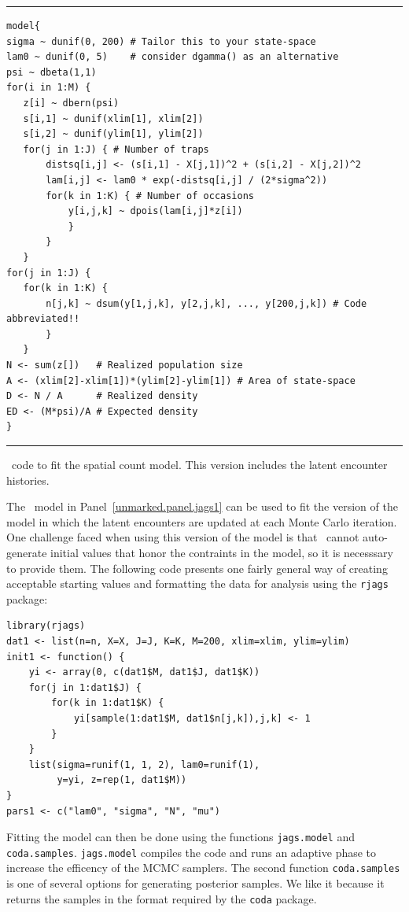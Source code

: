\begin{panel}
\centering
\rule[0.05in]{\textwidth}{.03in}
\begin{small}
\begin{verbatim}
model{
sigma ~ dunif(0, 200) # Tailor this to your state-space
lam0 ~ dunif(0, 5)    # consider dgamma() as an alternative
psi ~ dbeta(1,1)
for(i in 1:M) {
   z[i] ~ dbern(psi)
   s[i,1] ~ dunif(xlim[1], xlim[2])
   s[i,2] ~ dunif(ylim[1], ylim[2])
   for(j in 1:J) { # Number of traps
       distsq[i,j] <- (s[i,1] - X[j,1])^2 + (s[i,2] - X[j,2])^2
       lam[i,j] <- lam0 * exp(-distsq[i,j] / (2*sigma^2))
       for(k in 1:K) { # Number of occasions
           y[i,j,k] ~ dpois(lam[i,j]*z[i])
           }
       }
   }
for(j in 1:J) {
   for(k in 1:K) {
       n[j,k] ~ dsum(y[1,j,k], y[2,j,k], ..., y[200,j,k]) # Code abbreviated!!
       }
   }
N <- sum(z[])   # Realized population size
A <- (xlim[2]-xlim[1])*(ylim[2]-ylim[1]) # Area of state-space
D <- N / A      # Realized density
ED <- (M*psi)/A # Expected density
}

\end{verbatim}
\end{small}
\rule[0.15in]{\textwidth}{.03in}
\caption{\jags~code to fit the spatial count model. This version
  includes the latent encounter histories.}
\label{unmarked.panel.jags1}
\end{panel}

The \jags~model in Panel~\ref{unmarked.panel.jags1} can be used to
fit the version of the model in which the latent encounters are
updated at each Monte Carlo iteration. One challenge faced when using
this version of the model is that \jags~cannot auto-generate initial values
that honor the contraints in the model, so it is necesssary to provide
them. The following code presents one fairly general way of creating
acceptable starting values and formatting the data for analysis using
the \texttt{rjags} package:
\begin{small}
\begin{verbatim}
library(rjags)
dat1 <- list(n=n, X=X, J=J, K=K, M=200, xlim=xlim, ylim=ylim)
init1 <- function() {
    yi <- array(0, c(dat1$M, dat1$J, dat1$K))
    for(j in 1:dat1$J) {
        for(k in 1:dat1$K) {
            yi[sample(1:dat1$M, dat1$n[j,k]),j,k] <- 1
        }
    }
    list(sigma=runif(1, 1, 2), lam0=runif(1),
         y=yi, z=rep(1, dat1$M))
}
pars1 <- c("lam0", "sigma", "N", "mu")
\end{verbatim}
\end{small}
Fitting the model can then be done using the functions
\verb+jags.model+ and \verb+coda.samples+.
\verb+jags.model+ compiles the code and runs an adaptive phase to
increase the efficency of the MCMC samplers. The second function
\verb+coda.samples+ is one of several options for generating
posterior samples. We like it because it returns the samples in the
format required by the \texttt{coda} package.

